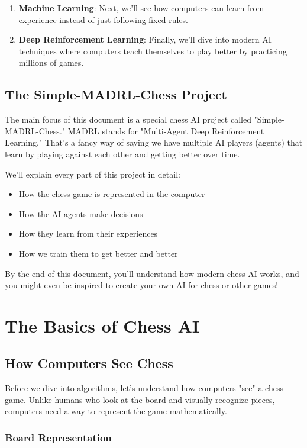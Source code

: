 \documentclass[11pt]{article}
\begin{document}
\begin{enumerate}
    \item \textbf{Machine Learning}: Next, we'll see how computers can learn from experience instead of just following fixed rules.

    \item \textbf{Deep Reinforcement Learning}: Finally, we'll dive into modern AI techniques where computers teach themselves to play better by practicing millions of games.
\end{enumerate}

\subsection{The Simple-MADRL-Chess Project}

The main focus of this document is a special chess AI project called "Simple-MADRL-Chess." MADRL stands for "Multi-Agent Deep Reinforcement Learning." That's a fancy way of saying we have multiple AI players (agents) that learn by playing against each other and getting better over time.

We'll explain every part of this project in detail:
\begin{itemize}
    \item How the chess game is represented in the computer
    \item How the AI agents make decisions
    \item How they learn from their experiences
    \item How we train them to get better and better
\end{itemize}

By the end of this document, you'll understand how modern chess AI works, and you might even be inspired to create your own AI for chess or other games!

\section{The Basics of Chess AI}

\subsection{How Computers See Chess}

Before we dive into algorithms, let's understand how computers "see" a chess game. Unlike humans who look at the board and visually recognize pieces, computers need a way to represent the game mathematically.

\subsubsection{Board Representation}
\end{document}

